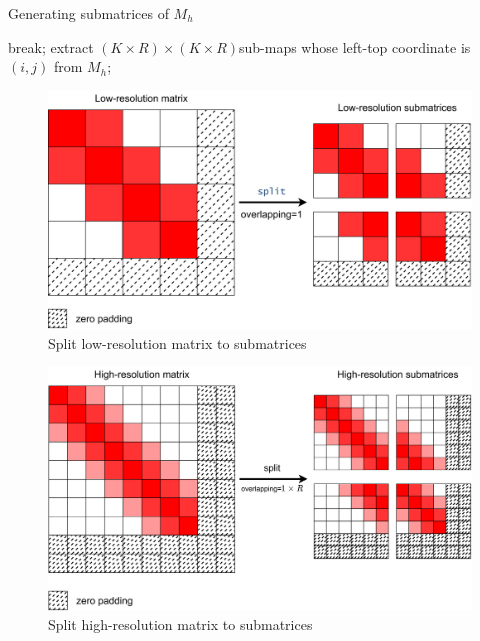 \documentclass{article}
\begin{document}
\begin{algorithm}[htbp]
\caption{Generating submatrices of $M_h$}
\begin{algorithmic}
                \STATE break; 
            \ELSE 
                \STATE extract $(K \times R) \times (K \times R)$sub-maps whose left-top coordinate is $(i,j)$ from $M_h$;
            \ENDIF
        \ENDFOR
    \ENDFOR    
\end{algorithmic}
\end{algorithm}

\begin{figure}[htbp]
\centering
\includegraphics[scale=0.03]{figures/lowres_split.png}
\caption{Split low-resolution matrix to submatrices}
\label{low-res to submatrices}
\end{figure}

\begin{figure}[htbp]
\centering
\includegraphics[scale=0.03]{figures/highres_split.png}
\caption{Split high-resolution matrix to submatrices}
\end{figure}
\end{document}
